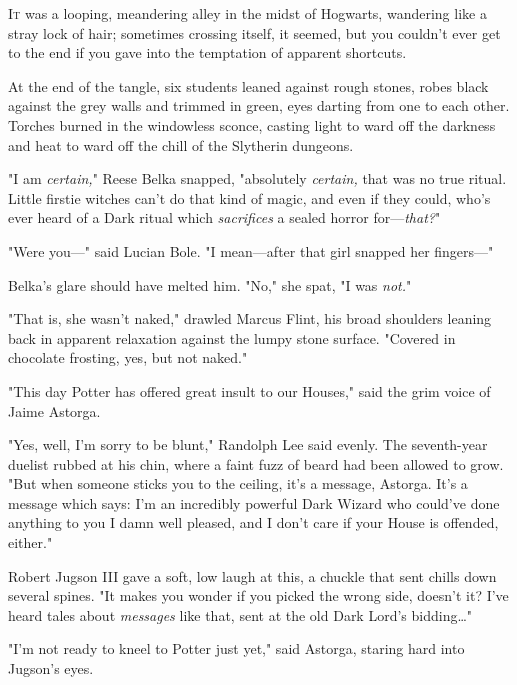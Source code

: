 
\label{ch-SelfActualizationSAXResponsibility}

\lettrine{I}{t} was a looping,
meandering alley in the midst of Hogwarts, wandering like a stray lock of hair;
sometimes crossing itself, it seemed, but you couldn't ever get to the end if
you gave into the temptation of apparent shortcuts.

At the end of the tangle, six students leaned against rough stones, robes black
against the grey walls and trimmed in green, eyes darting from one to each
other. Torches burned in the windowless sconce, casting light to ward off the
darkness and heat to ward off the chill of the Slytherin dungeons.

"I am \emph{certain,}" Reese Belka snapped, "absolutely \emph{certain,} that
was no true ritual. Little firstie witches can't do that kind of magic, and
even if they could, who's ever heard of a Dark ritual which \emph{sacrifices} a
sealed horror for---\emph{that?}"

"Were you---" said Lucian Bole. "I mean---after that girl snapped her
fingers---"

Belka's glare should have melted him. "No," she spat, "I was \emph{not.}"

"That is, she wasn't naked," drawled Marcus Flint, his broad shoulders leaning
back in apparent relaxation against the lumpy stone surface. "Covered in
chocolate frosting, yes, but not naked."

"This day Potter has offered great insult to our Houses," said the grim voice
of Jaime Astorga.

"Yes, well, I'm sorry to be blunt," Randolph Lee said evenly. The seventh-year
duelist rubbed at his chin, where a faint fuzz of beard had been allowed to
grow. "But when someone sticks you to the ceiling, it's a message, Astorga.
It's a message which says: I'm an incredibly powerful Dark Wizard who could've
done anything to you I damn well pleased, and I don't care if your House is
offended, either."

Robert Jugson III gave a soft, low laugh at this, a chuckle that sent chills
down several spines. "It makes you wonder if you picked the wrong side, doesn't
it? I've heard tales about \emph{messages} like that, sent at the old Dark
Lord's bidding{\ldots}"

"I'm not ready to kneel to Potter just yet," said Astorga, staring hard into
Jugson's eyes.

